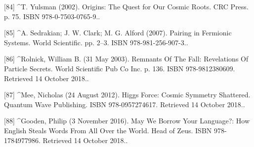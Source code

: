 [84]
^T. Yulsman (2002). Origins: The Quest for Our Cosmic Roots. CRC Press. p. 75. ISBN 978-0-7503-0765-9..

[85]
^A. Sedrakian; J. W. Clark; M. G. Alford (2007). Pairing in Fermionic Systems. World Scientific. pp. 2–3. ISBN 978-981-256-907-3..

[86]
^Rolnick, William B. (31 May 2003). Remnants Of The Fall: Revelations Of Particle Secrets. World Scientific Pub Co Inc. p. 136. ISBN 978-9812380609. Retrieved 14 October 2018..

[87]
^Mee, Nicholas (24 August 2012). Higgs Force: Cosmic Symmetry Shattered. Quantum Wave Publishing. ISBN 978-0957274617. Retrieved 14 October 2018..

[88]
^Gooden, Philip (3 November 2016). May We Borrow Your Language?: How English Steals Words From All Over the World. Head of Zeus. ISBN 978-1784977986. Retrieved 14 October 2018..
